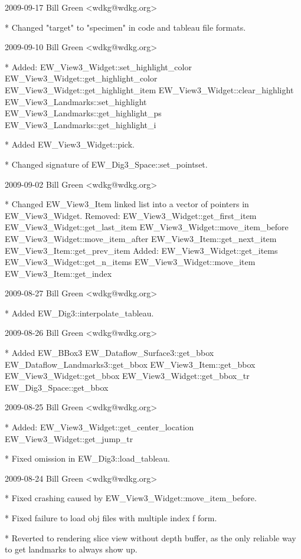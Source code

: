 \begin{DoxyVerbInclude}
2009-09-17  Bill Green  <wdkg@wdkg.org>

    * Changed "target" to "specimen" in code and tableau file formats.


2009-09-10  Bill Green  <wdkg@wdkg.org>

    * Added:
      EW_View3_Widget::set_highlight_color
      EW_View3_Widget::get_highlight_color
      EW_View3_Widget::get_highlight_item
      EW_View3_Widget::clear_highlight
      EW_View3_Landmarks::set_highlight
      EW_View3_Landmarks::get_highlight_ps
      EW_View3_Landmarks::get_highlight_i

    * Added EW_View3_Widget::pick.

    * Changed signature of EW_Dig3_Space::set_pointset.


2009-09-02  Bill Green  <wdkg@wdkg.org>

    * Changed EW_View3_Item linked list into a vector of pointers in
    EW_View3_Widget.
    Removed:
        EW_View3_Widget::get_first_item
        EW_View3_Widget::get_last_item
        EW_View3_Widget::move_item_before
        EW_View3_Widget::move_item_after
        EW_View3_Item::get_next_item
        EW_View3_Item::get_prev_item
    Added:
        EW_View3_Widget::get_items
        EW_View3_Widget::get_n_items
        EW_View3_Widget::move_item
        EW_View3_Item::get_index


2009-08-27  Bill Green  <wdkg@wdkg.org>

    * Added EW_Dig3::interpolate_tableau.


2009-08-26  Bill Green  <wdkg@wdkg.org>

    * Added
        EW_BBox3
        EW_Dataflow_Surface3::get_bbox
        EW_Dataflow_Landmarks3::get_bbox
        EW_View3_Item::get_bbox
        EW_View3_Widget::get_bbox
        EW_View3_Widget::get_bbox_tr
        EW_Dig3_Space::get_bbox


2009-08-25  Bill Green  <wdkg@wdkg.org>

    * Added:
        EW_View3_Widget::get_center_location
        EW_View3_Widget::get_jump_tr

    * Fixed omission in EW_Dig3::load_tableau.


2009-08-24  Bill Green  <wdkg@wdkg.org>

    * Fixed crashing caused by EW_View3_Widget::move_item_before.

    * Fixed failure to load obj files with multiple index f form.

    * Reverted to rendering slice view without depth buffer, as the only
    reliable way to get landmarks to always show up.



\end{DoxyVerbInclude}
